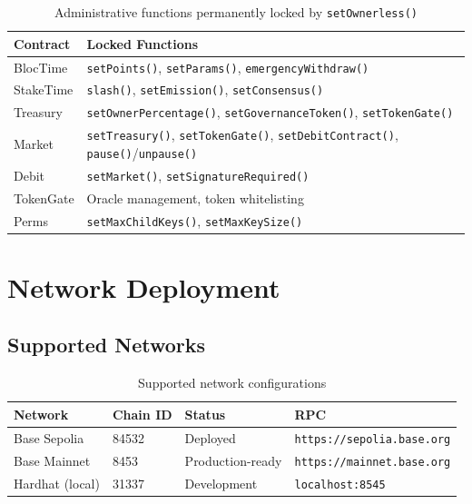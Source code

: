 \documentclass[11pt,a4paper]{article}
\begin{document}
\begin{table}[H]
\centering
\begin{tabularx}{\textwidth}{lX}
\toprule
\textbf{Contract} & \textbf{Locked Functions} \\
\midrule
BlocTime & \texttt{setPoints()}, \texttt{setParams()}, \texttt{emergencyWithdraw()} \\
StakeTime & \texttt{slash()}, \texttt{setEmission()}, \texttt{setConsensus()} \\
Treasury & \texttt{setOwnerPercentage()}, \texttt{setGovernanceToken()}, \texttt{setTokenGate()} \\
Market & \texttt{setTreasury()}, \texttt{setTokenGate()}, \texttt{setDebitContract()}, \texttt{pause()}/\texttt{unpause()} \\
Debit & \texttt{setMarket()}, \texttt{setSignatureRequired()} \\
TokenGate & Oracle management, token whitelisting \\
Perms & \texttt{setMaxChildKeys()}, \texttt{setMaxKeySize()} \\
\bottomrule
\end{tabularx}
\caption{Administrative functions permanently locked by \texttt{setOwnerless()}}
\end{table}

\section{Network Deployment}
\label{sec:deployment}

\subsection{Supported Networks}

\begin{table}[H]
\centering
\begin{tabular}{llll}
\toprule
\textbf{Network} & \textbf{Chain ID} & \textbf{Status} & \textbf{RPC} \\
\midrule
Base Sepolia & 84532 & Deployed & \texttt{https://sepolia.base.org} \\
Base Mainnet & 8453 & Production-ready & \texttt{https://mainnet.base.org} \\
Hardhat (local) & 31337 & Development & \texttt{localhost:8545} \\
\bottomrule
\end{tabular}
\caption{Supported network configurations}
\end{table}
\end{document}
